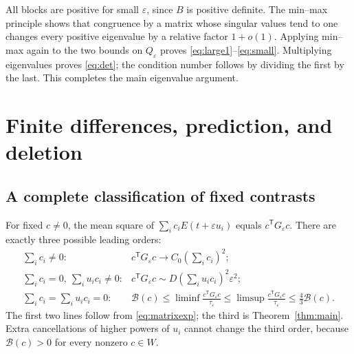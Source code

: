 \documentclass[11pt]{article}
\theoremstyle{definition}\newtheorem{definition}[theorem]{Definition}
\theoremstyle{remark}\newtheorem{remark}[theorem]{Remark}
\newcommand{\eps}{\varepsilon}
\newcommand{\tr}{\mathsf T}
\newcommand{\tauE}{\tau_\eps}
\newcommand{\bB}{\mathcal B}
\begin{document}
All blocks are positive for small $\eps$, since $B$ is positive
definite. The min--max principle shows that congruence by a matrix
whose singular values tend to one changes every positive eigenvalue
by a relative factor $1+o(1)$. Applying min--max again to the two bounds
on $Q_\eps$ proves \eqref{eq:large1}--\eqref{eq:small}.
Multiplying eigenvalues proves \eqref{eq:det}; the condition number
follows by dividing the first by the last. This completes the main
eigenvalue argument.

\section{Finite differences, prediction, and deletion}\label{sec:prediction}
\subsection{A complete classification of fixed contrasts}
For fixed $c\ne0$, the mean square of
$\sum_i c_iE(t+\eps u_i)$ equals $c^\tr G_\eps c$. There are exactly
three possible leading orders:
\begin{equation}\label{eq:trichotomy}
\begin{array}{ll}
 \sum_i c_i\ne0:&
 c^\tr G_\eps c\longrightarrow C_0(\sum_i c_i)^2;\\[3pt]
 \sum_i c_i=0,\ \sum_i u_i c_i\ne0:&
 c^\tr G_\eps c\sim D(\sum_i u_i c_i)^2\eps^2;\\[3pt]
 \sum_i c_i=\sum_i u_i c_i=0:&
 \bB(c)\le\liminf\frac{c^\tr G_\eps c}{\tauE}
 \le\limsup\frac{c^\tr G_\eps c}{\tauE}\le\frac43\bB(c).
\end{array}
\end{equation}
The first two lines follow from \eqref{eq:matrixexp}; the third is
Theorem~\ref{thm:main}. Extra cancellations of higher powers of $u_i$
cannot change the third order, because $\bB(c)>0$ for every nonzero
$c\in W$.
\end{document}
